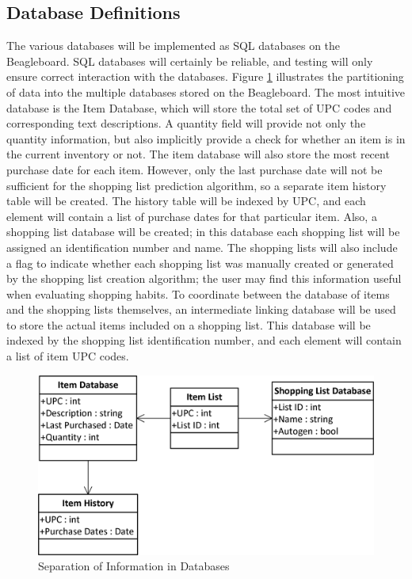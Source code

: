 \documentclass[11pt]{article} %
\begin{document}
\subsection{Database Definitions}
The various databases will be implemented as SQL databases on the Beagleboard. SQL databases will certainly be reliable, and testing will only ensure correct interaction with the databases. Figure \ref{fig:databases} illustrates the partitioning of data into the multiple databases stored on the Beagleboard. The most intuitive database is the Item Database, which will store the total set of UPC codes and corresponding text descriptions. A quantity field will provide not only the quantity information, but also implicitly provide a check for whether an item is in the current inventory or not. The item database will also store the most recent purchase date for each item. However, only the last purchase date will not be sufficient for the shopping list prediction algorithm, so a separate item history table will be created. The history table will be indexed by UPC, and each element will contain a list of purchase dates for that particular item. Also, a shopping list database will be created; in this database each shopping list will be assigned an identification number and name. The shopping lists will also include a flag to indicate whether each shopping list was manually created or generated by the shopping list creation algorithm; the user may find this information useful when evaluating shopping habits. To coordinate between the database of items and the shopping lists themselves, an intermediate linking database will be used to store the actual items included on a shopping list. This database will be indexed by the shopping list identification number, and each element will contain a list of item UPC codes.
\begin{figure}[h!]
\begin{center}
\includegraphics[scale=1.0]{../Graphics/Databases}
\caption{Separation of Information in Databases}
\label{fig:databases}
\end{center}
\end{figure}
\end{document}
